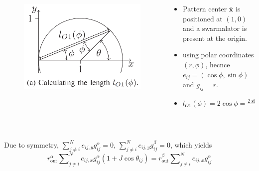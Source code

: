 \documentclass[10pt,aspectratio=43,mathserif,table]{beamer}
\begin{document}
\begin{frame}
    \begin{columns}
        \begin{column}{0.4\textwidth}
            \begin{figure}
                \centering
                \includegraphics[width=\textwidth]{f2a.png}
            \end{figure}
        \end{column}
        \begin{column}{0.6\textwidth}
            \footnotesize
            \begin{itemize}
                \item Pattern center $\bar{\boldsymbol{x}}$ is positioned at $(1, 0)$ and a swarmalator is present at the origin.
                \item using polar coordinates $(r, \phi)$, hecnce $e_{ij}=\left( \cos \phi ,\sin \phi  \right)$ and $g_{ij}=r$.
                \item $
                l_{O1}\left( \phi \right) =2\cos \phi =\frac{2\sin \phi \cos \phi}{\sin \phi}=\frac{\sin 2\phi}{\sin \phi}
                $
            \end{itemize}
            
        \end{column}
    \end{columns}
    
    $ $

    Due to symmetry, $\sum\nolimits_{j\ne i}^N{e_{ij,y}g_{ij}^{\alpha}}=0$, $\sum\nolimits_{j\ne i}^N{e_{ij,y}g_{ij}^{\beta}}=0$,  
    which yields 
    \vspace{-0.2cm}
    $$r_{\mathrm{out}}^{\alpha}\sum\nolimits_{j\ne i}^N{e_{ij,x}g_{ij}^{\alpha}\left( 1+J\cos \theta _{ij} \right)}=r_{\mathrm{out}}^{\beta}\sum\nolimits_{j\ne i}^N{e_{ij,x}g_{ij}^{\alpha}}$$


\end{frame}
\end{document}
